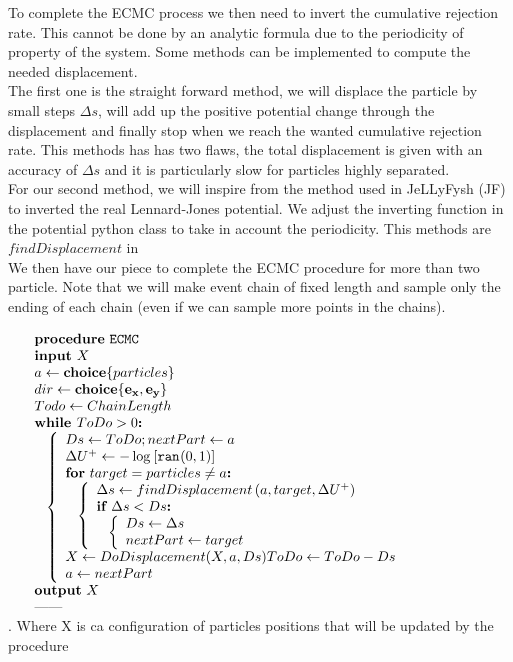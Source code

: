 \documentclass[jcp,twocolumn,longbibliography,superscriptaddress]{revtex4-2}
\begin{document}
	To complete the ECMC process we then need to invert the cumulative rejection rate. This cannot be done by an analytic formula due to the periodicity of property of the system. Some methods can be implemented to compute the needed displacement. \\
	The first one is the straight forward method, we will displace the particle by small steps $\Delta s$, will add up the positive potential change through the displacement and finally stop when we reach the wanted cumulative rejection rate. This methods has has two flaws, the total displacement is given with an accuracy of $\Delta s$ and it is particularly slow for particles highly separated.\\
	For our second method, we will inspire from the method used in JeLLyFysh (JF) \cite{Hoellmer2020} to inverted the real Lennard-Jones potential. We adjust the inverting function in the potential python class to take in account the periodicity. This methods are $findDisplacement$ in \\
	We then have our piece to complete the ECMC procedure for more than two particle. Note that we will make event chain of fixed length and sample only the ending of each chain (even if we can sample more points in the chains).
	\begin{algorithm}[htb]
		\newcommand{\algo}{ECMC}
		\captionsetup{margin=0pt,justification=raggedright}
		\begin{center}
			$\begin{array}{ll}
				& \PROCEDURE{\algo}\\
				& \INPUT{X}\\
				& \IS{a}{\CHOICE{particles}}\\
				& \IS{dir}{\CHOICE{\VEC{e_x},\VEC{e_y}}}\\
				& \IS{Todo}{ChainLength}\\
				& \WHILE{ToDo > 0}\\
				& \BRACE{
					\IS{Ds}{ToDo}; \IS{nextPart}{a}\\
					\IS{\Delta U^+}{-\logc{\ranb{0,1}}}\\
					\FOR{target = particles \neq a}\\
					\BRACE{
						\IS{\Delta s}{findDisplacement\glb a,target,\Delta U^+\grb}\\
						\IF{\Delta s < Ds}\\
						\BRACE{
							\IS{Ds}{\Delta s}\\
							\IS{nextPart}{target}
						}\\
					}\\
					\IS{X}{DoDisplacement(X,a,Ds)}
					\IS{ToDo}{ToDo - Ds}\\
					\IS{a}{nextPart}
				}\\
				& \OUTPUT{X}\\
				& \ENDPROCEDURE\
			\end{array}$
		\end{center}
		\caption{\sub{\algo}. Where X is ca configuration of particles positions that will be updated by the procedure}
		\label{alg:\algo}
	\end{algorithm}
	
\end{document}
